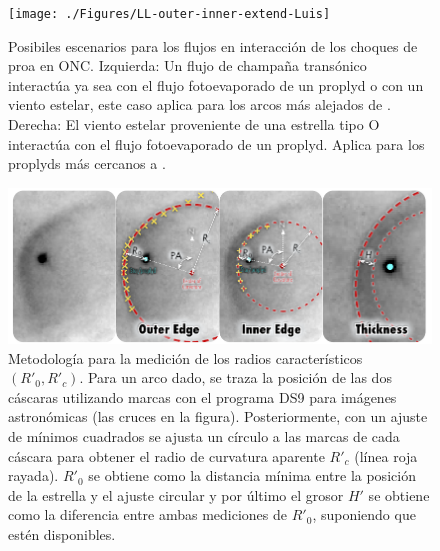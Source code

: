 \begin{figure}
  \texttt{[image: ./Figures/LL-outer-inner-extend-Luis]}
  \caption{Posibiles escenarios para los flujos en interacción de los choques de proa en ONC. Izquierda: Un flujo de champaña transónico interactúa ya sea con el flujo fotoevaporado de un proplyd o con un viento estelar, este caso aplica para los arcos más alejados de \thC{}. Derecha: El viento estelar proveniente de una estrella tipo O interactúa con el flujo fotoevaporado de un proplyd. Aplica para los proplyds más cercanos a \thC{}.}
  \label{fig:LL-scheme}
\end{figure}

\begin{figure}
  \includegraphics[width=0.7\linewidth]{./Figures/radius-methodology-Luis}
  \caption{Metodología para la medición de los radios característicos $(R'_0, R'_c)$. Para un arco dado, se traza la posición de las dos cáscaras utilizando marcas con el programa DS9 para imágenes astronómicas (las cruces en la figura). Posteriormente, con un ajuste de mínimos cuadrados se ajusta un círculo a las marcas de cada cáscara para obtener el radio de curvatura aparente $R'_c$ (línea roja rayada). $R'_0$ se obtiene como la distancia mínima entre la posición de la estrella y el ajuste circular y por último el grosor $H'$ se obtiene como la diferencia entre ambas mediciones de $R'_0$, suponiendo que estén disponibles.}
  \label{fig:methodology-LL}
\end{figure}

